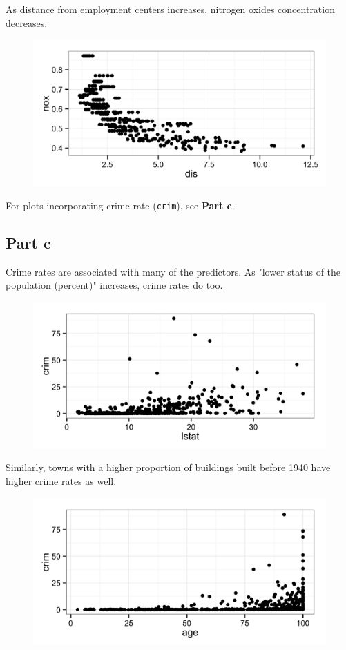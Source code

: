 \documentclass[11pt]{article}
\begin{document}
As distance from employment centers increases, nitrogen oxides concentration decreases.
\begin{figure}[H]
	\centering
	\includegraphics[width=5in]{10b_nox_vs_dis.png}
\end{figure}

For plots incorporating crime rate (\texttt{crim}), see \textbf{Part c}.

\subsection*{Part c}

Crime rates are associated with many of the predictors. As "lower status of the population (percent)" increases, crime rates do too.

\begin{figure}[H]
	\centering
	\includegraphics[width=5in]{10b_crim_vs_lstat.png}
\end{figure}

Similarly, towns with a higher proportion of buildings built before 1940 have higher crime rates as well.
\begin{figure}[H]
	\centering
	\includegraphics[width=5in]{10b_crim_vs_age.png}
\end{figure}
\end{document}

